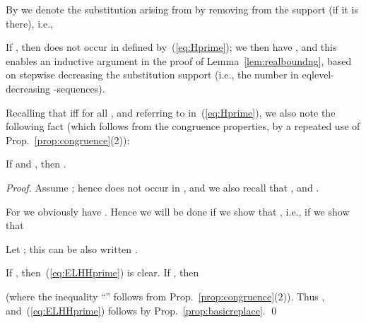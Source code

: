 \documentclass{llncs}
\begin{document}
By  we denote the substitution arising
from  by removing  from the
support (if it is there), i.e., 
\begin{center}

\end{center}
	If , then  does not occur in 
	defined by~(\ref{eq:Hprime}); we then have
, and this enables an inductive argument 
in the proof of Lemma~\ref{lem:realboundng}, based on stepwise
decreasing the substitution support (i.e., the number  in
eqlevel-decreasing -sequences).

Recalling that  iff 
for all , and referring
to  in~(\ref{eq:Hprime}), we also note the following fact
(which follows from the congruence properties,
by a  repeated use of Prop.~\ref{prop:congruence}(2)):

\begin{proposition}\label{prop:congrlimit}
If  
and ,
then . 	
\end{proposition}	

\begin{proof}
Assume ; hence  does not occur in
, and we also recall that , and .

For  we obviously have 
.
Hence we will be done if we show that 
,
i.e., if we show that

Let
; this can be also written 
.

If , 
then~(\ref{eq:ELHHprime}) is clear.
If , then 
\begin{center}

\end{center}
(where the inequality ``'' follows from
Prop.~\ref{prop:congruence}(2)).
Thus ,
and~(\ref{eq:ELHHprime}) follows
by Prop.~\ref{prop:basicreplace}.
\qed
\end{proof}
\end{document}
